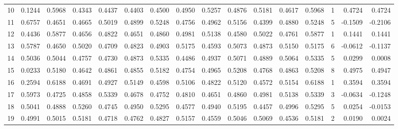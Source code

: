 \begin{tabular}{lrrrrrrrrrrrrrrr}
10 &      0.1244 &  0.5968 &  0.4343 &  0.4437 &  0.4403 &  0.4500 &  0.4950 &  0.5257 &  0.4876 &  0.5181 &   0.4617 &     0.5968 &      1 &                    0.4724 &                     0.4724 \\
11 &      0.6757 &  0.4651 &  0.4665 &  0.5019 &  0.4899 &  0.5248 &  0.4756 &  0.4962 &  0.5156 &  0.4399 &   0.4880 &     0.5248 &      5 &                   -0.1509 &                    -0.2106 \\
12 &      0.4436 &  0.5877 &  0.4656 &  0.4822 &  0.4651 &  0.4860 &  0.4981 &  0.5138 &  0.4580 &  0.5022 &   0.4761 &     0.5877 &      1 &                    0.1441 &                     0.1441 \\
13 &      0.5787 &  0.4650 &  0.5020 &  0.4709 &  0.4823 &  0.4903 &  0.5175 &  0.4593 &  0.5073 &  0.4873 &   0.5150 &     0.5175 &      6 &                   -0.0612 &                    -0.1137 \\
14 &      0.5036 &  0.5044 &  0.4757 &  0.4730 &  0.4873 &  0.5335 &  0.4486 &  0.4937 &  0.5071 &  0.4889 &   0.5064 &     0.5335 &      5 &                    0.0299 &                     0.0008 \\
15 &      0.0233 &  0.5180 &  0.4642 &  0.4861 &  0.4855 &  0.5182 &  0.4754 &  0.4965 &  0.5208 &  0.4768 &   0.4863 &     0.5208 &      8 &                    0.4975 &                     0.4947 \\
16 &      0.2594 &  0.6188 &  0.4691 &  0.4927 &  0.5149 &  0.4598 &  0.5106 &  0.4822 &  0.5120 &  0.4572 &   0.5154 &     0.6188 &      1 &                    0.3594 &                     0.3594 \\
17 &      0.5973 &  0.4725 &  0.4858 &  0.5339 &  0.4678 &  0.4752 &  0.4810 &  0.4651 &  0.4860 &  0.4981 &   0.5138 &     0.5339 &      3 &                   -0.0634 &                    -0.1248 \\
18 &      0.5041 &  0.4888 &  0.5260 &  0.4745 &  0.4950 &  0.5295 &  0.4577 &  0.4940 &  0.5195 &  0.4457 &   0.4996 &     0.5295 &      5 &                    0.0254 &                    -0.0153 \\
19 &      0.4991 &  0.5015 &  0.5181 &  0.4718 &  0.4762 &  0.4827 &  0.5157 &  0.4559 &  0.5046 &  0.5069 &   0.4536 &     0.5181 &      2 &                    0.0190 &                     0.0024 \\
\bottomrule
\end{tabular}
